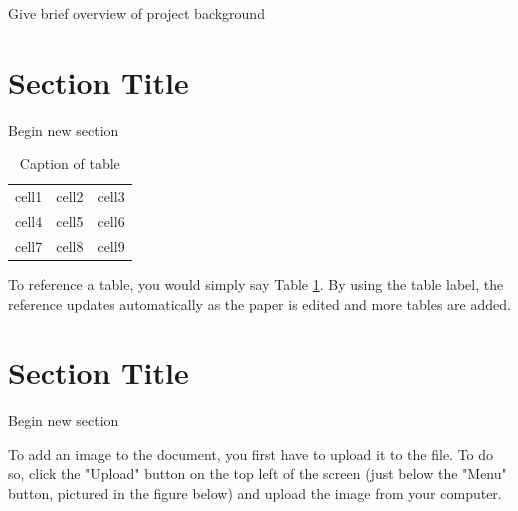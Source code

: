 \documentclass{article}
\begin{document}
\begin{doublespacing}
\noindent Give brief overview of project background

\newpage %
\section{Section Title}

\noindent Begin new section


\begin{table}[!tb] %
    \begin{center}
        \begin{tabular}{ |c|c|c| } 
            \hline
            cell1 & cell2 & cell3 \\ 
            cell4 & cell5 & cell6 \\ 
            cell7 & cell8 & cell9 \\ 
            \hline
        \end{tabular}
        \caption{Caption of table} %
        \label{table:label_of_table} %
    \end{center}
\end{table}

\par To reference a table, you would simply say Table \ref{table:label_of_table}. By using the table label, the reference updates automatically as the paper is edited and more tables are added.


\section{Section Title}

\noindent Begin new section


\par To add an image to the document, you first have to upload it to the file. To do so, click the "Upload" button on the top left of the screen (just below the "Menu" button, pictured in the figure below) and upload the image from your computer. 


\end{doublespacing}
\end{document}
